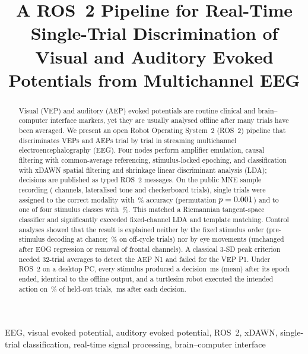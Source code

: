 \documentclass[conference]{IEEEtran}
\begin{document}
\title{A ROS~2 Pipeline for Real-Time Single-Trial Discrimination of Visual and Auditory Evoked Potentials from Multichannel EEG}

\author{
}

\maketitle

\begin{abstract}
Visual (VEP) and auditory (AEP) evoked potentials are routine clinical and brain--computer interface markers, yet they are usually analysed offline after many trials have been averaged. We present an open Robot Operating System~2 (ROS~2) pipeline that discriminates VEPs and AEPs trial by trial in streaming multichannel electroencephalography (EEG). Four nodes perform amplifier emulation, causal filtering with common-average referencing, stimulus-locked epoching, and classification with xDAWN spatial filtering and shrinkage linear discriminant analysis (LDA); decisions are published as typed ROS~2 messages. On the public MNE sample recording (\Nch{} channels, \Ntrials{} lateralised tone and checkerboard trials), single trials were assigned to the correct modality with \AccModX\,\% accuracy (permutation $p=0.001$) and to one of four stimulus classes with \AccFourX\,\%. This matched a Riemannian tangent-space classifier and significantly exceeded fixed-channel LDA and template matching. Control analyses showed that the result is explained neither by the fixed stimulus order (pre-stimulus decoding at chance; \OffCycleMod\,\% on off-cycle trials) nor by eye movements (unchanged after EOG regression or removal of frontal channels). A classical 3-SD peak criterion needed 32-trial averages to detect the AEP N1 and failed for the VEP P1. Under ROS~2 on a desktop PC, every stimulus produced a decision \RosExcess\,ms (mean) after its epoch ended, identical to the offline output, and a turtlesim robot executed the intended action on \RobotAcc\,\% of held-out trials, \RobotCmd\,ms after each decision.
\end{abstract}

\begin{IEEEkeywords}
EEG, visual evoked potential, auditory evoked potential, ROS~2, xDAWN, single-trial classification, real-time signal processing, brain--computer interface
\end{IEEEkeywords}
\end{document}
